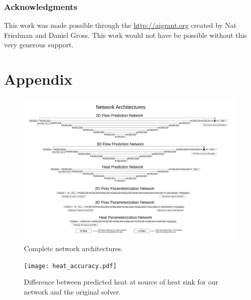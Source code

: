 \documentclass{article} %
\begin{document}
\subsubsection*{Acknowledgments}

This work was made possible through the \url{http://aigrant.org} created by Nat Friedman and Daniel Gross. This work would not have be possible without this very generous support.




\section{Appendix}

\begin{figure}[!h]
\begin{center}
\includegraphics[scale=0.45]{appendix_flow_net.pdf}
\end{center}
\caption{Complete network architectures.}
\label{network_architectures}
\end{figure}

\begin{figure}[!h]
\begin{center}
\texttt{[image: heat\_accuracy.pdf]}
\end{center}
\caption{Difference between predicted heat at source of heat sink for our network and the original solver.}
\label{heat_accuracy}
\end{figure}
\end{document}
